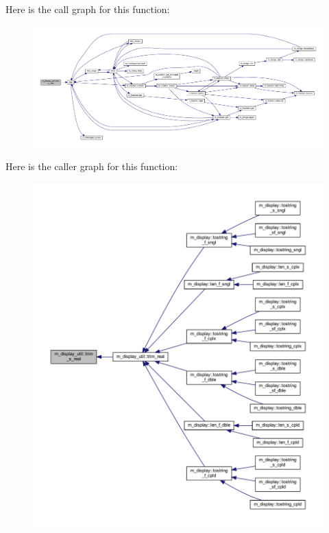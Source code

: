 Here is the call graph for this function\+:
\nopagebreak
\begin{figure}[H]
\begin{center}
\leavevmode
\includegraphics[width=350pt]{namespacem__display__util_ab69265e4c62f2b4c20d1a2b59e25959b_cgraph}
\end{center}
\end{figure}
Here is the caller graph for this function\+:
\nopagebreak
\begin{figure}[H]
\begin{center}
\leavevmode
\includegraphics[width=350pt]{namespacem__display__util_ab69265e4c62f2b4c20d1a2b59e25959b_icgraph}
\end{center}
\end{figure}
\mbox{\label{namespacem__display__util_a6a829115368f9e77c8b35fb1c86ac9c3}} 
